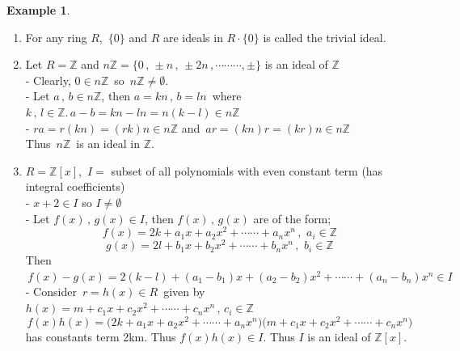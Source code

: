 \documentclass[11pt,a4paper]{article}
\theoremstyle{definition}
\newtheorem{exa}[thm]{Example}
\begin{document}
\begin{exa}
\begin{enumerate}
\item For any ring $R$, $\, \{0\}$ and $R$ are ideals in $R\cdot \{0\}$ is called the trivial ideal.

\item Let $R= \mathbb{Z}$ and $n\mathbb{Z} = \big\{0\, ,\, \pm n\, , \, \pm 2n\, , \cdots\cdots\cdots, \pm\big\}$ is an ideal of $\mathbb{Z}$\\
- Clearly, $0\in n\mathbb{Z}\,$ so $\,n\mathbb{Z}\neq \emptyset$.\\
- Let $a\, , \, b\in n\mathbb{Z}$, then $a = kn\, , \, b = ln\,$ where $k\, , \, l\in \mathbb{Z}. \, a - b = kn - ln = n(k-l) \in n\mathbb{Z}$\\
- $ra = r(kn) = (rk)n\in n\mathbb{Z}$ and $\, ar = (kn)r = (kr)n\in n\mathbb{Z}$\\

Thus $\, n\mathbb{Z}\,$ is an ideal in $\mathbb{Z}$.\\


\item $R = \mathbb{Z}[x]$, $\, I = $ subset of all polynomials with even constant term  (has integral coefficients)\\
- $x + 2 \in I$ so $I\neq \emptyset$\\
- Let $f(x)\, , \, g(x) \in I$, then $f(x)\, , \, g(x)$ are of the form;
$$f(x) = 2k + a_1x + a_2 x^2 + \cdots\cdots + a_n x^n\, , \, \, a_i\in \mathbb{Z}$$
$$g(x) = 2l + b_1 x + b_2 x^2 + \cdots\cdots + b_n x^n\, ,\,\, b_i\in \mathbb{Z}$$
Then $\, f(x) - g(x) = 2(k-l) + (a_1 - b_1)x + (a_2 - b_2)x^2 + \cdots\cdots + (a_n - b_n) x^n \in I$\\

- Consider $\, r = h(x) \in R\,$ given by $h(x) = m + c_1 x + c_2 x^2 + \cdots\cdots + c_n x^n\, , \, c_i\in \mathbb{Z}$
$$f(x)h(x) = \big(2k + a_1 x + a_2 x^2 + \cdots\cdots + a_n x^n\big)\big(m + c_1 x + c_2 x^2 + \cdots\cdots + c_nx^n\big)$$
has constants term 2km. Thus $f(x)h(x) \in I$. Thus $I$ is an ideal of $\mathbb{Z}[x]$.\\\\
\end{enumerate}
\end{exa}
\end{document}
